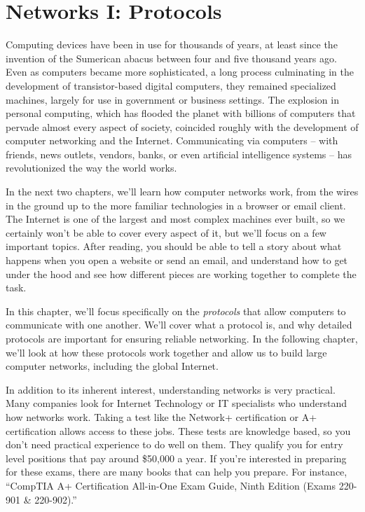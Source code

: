 \chapter{Networks I: Protocols}

Computing devices have been in use for thousands of years, at least since the invention of the Sumerican abacus between four and five thousand years ago. Even as computers became more sophisticated, a long process culminating in the development of transistor-based digital computers, they remained specialized machines, largely for use in government or business settings. The explosion in personal computing, which has flooded the planet with billions of computers that pervade almost every aspect of society, coincided roughly with the development of computer networking and the Internet. Communicating via computers -- with friends, news outlets, vendors, banks, or even artificial intelligence systems -- has revolutionized the way the world works.

In the next two chapters, we'll learn how computer networks work, from the wires in the ground up to the more familiar technologies in a browser or email client. The Internet is one of the largest and most complex machines ever built, so we certainly won't be able to cover every aspect of it, but we'll focus on a few important topics. After reading, you should be able to tell a story about what happens when you open a website or send an email, and understand how to get under the hood and see how different pieces are working together to complete the task.

In this chapter, we'll focus specifically on the \emph{protocols} that allow computers to communicate with one another. We'll cover what a protocol is, and why detailed protocols are important for ensuring reliable networking. In the following chapter, we'll look at how these protocols work together and allow us to build large computer networks, including the global Internet.

In addition to its inherent interest, understanding networks is very practical. Many companies look for Internet Technology or IT specialists who understand how networks work. Taking a test like the Network+ certification or A+ certification allows access to these jobs. These tests are knowledge based, so you don’t need practical experience to do well on them. They qualify you for entry level positions that pay around \$50,000 a year. If you're interested in preparing for these exams, there are many books that can help you prepare. For instance, ``CompTIA A+ Certification All-in-One Exam Guide, Ninth Edition (Exams 220-901 \& 220-902).''

